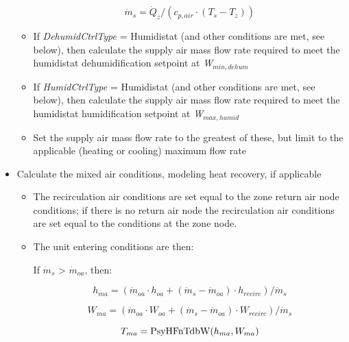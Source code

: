\begin{itemize}
\begin{itemize}
        \begin{equation}
          {\dot m_s} = {\dot Q_z}/({c_{p,air}}\cdot ({T_s} - {T_z}))
        \end{equation}

      \item If \emph{DehumidCtrlType} = Humidistat (and other conditions are met, see below), then calculate the supply air mass flow rate required to meet the humidistat dehumidification setpoint at \emph{W\(_{min,dehum}\)}

      \item If \emph{HumidCtrlType} = Humidistat (and other conditions are met, see below), then calculate the supply air mass flow rate required to meet the humidistat humidification setpoint at \emph{W\(_{max,humid}\)}

      \item Set the supply air mass flow rate to the greatest of these, but limit to the applicable (heating or cooling) maximum flow rate
    \end{itemize}

  \item Calculate the mixed air conditions, modeling heat recovery, if applicable

    \begin{itemize}
      \item The recirculation air conditions are set equal to the zone return air node conditions; if there is no return air node the recirculation air conditions are set equal to the conditions at the zone node.
      \item The unit entering conditions are then:

        If \({\dot m_s}\) \textgreater{} \({\dot m_{oa}}\), then:

        \begin{equation}
          {h_{ma}} = ({\dot m_{oa}} \cdot {h_{oa}} + ({\dot m_s} - {\dot m_{oa}}) \cdot {h_{recirc}})/{\dot m_s}
        \end{equation}

        \begin{equation}
          {W_{ma}} = ({\dot m_{oa}} \cdot {W_{oa}} + ({\dot m_s} - {\dot m_{oa}}) \cdot {W_{recirc}})/{\dot m_s}
        \end{equation}

        \begin{equation}
          {T_{ma}} = {\mathop{\rm PsyHFnTdbW}\nolimits} ({h_{ma}},{W_{ma}})
        \end{equation}


\end{itemize}
\end{itemize}
